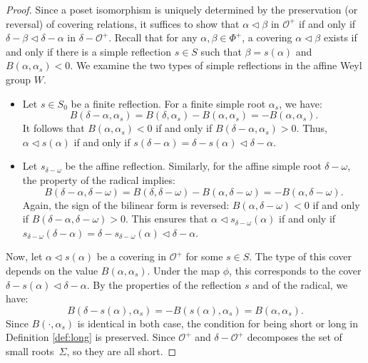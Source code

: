 \documentclass{amsart}
\theoremstyle{definition}
\newcommand{\mo}{\mathcal{O}}
\begin{document}
\begin{proof}
Since a poset isomorphism is uniquely determined by the preservation (or reversal) of covering relations, it suffices to show that $\alpha \lhd \beta$ in $\mo^+$ if and only if $\delta - \beta \lhd \delta - \alpha$ in $\delta - \mo^+$. Recall that for any $\alpha, \beta \in \Phi^+$, a covering $\alpha \lhd \beta$ exists if and only if there is a simple reflection $s \in S$ such that $\beta = s(\alpha)$ and $B(\alpha, \alpha_s) < 0$. We examine the two types of simple reflections in the affine Weyl group $W$.

\begin{itemize}
    \item[(i)] Let $s \in S_0$ be a finite reflection. For a finite simple root $\alpha_s$, we have:
    \[ B(\delta - \alpha, \alpha_s) = B(\delta, \alpha_s) - B(\alpha, \alpha_s) = -B(\alpha, \alpha_s). \]
    It follows that $B(\alpha, \alpha_s) < 0$ if and only if $B(\delta - \alpha, \alpha_s) > 0$. Thus, $\alpha \lhd s(\alpha)$ if and only if  $s(\delta - \alpha) = \delta - s(\alpha) \lhd \delta - \alpha$.

    \item[(ii)] Let $s_{\delta-\omega}$ be the affine reflection. Similarly, for the affine simple root $\delta - \omega$, the property of the radical implies:
    \[ B(\delta - \alpha, \delta - \omega) = B(\delta, \delta - \omega) - B(\alpha, \delta - \omega) = -B(\alpha, \delta - \omega). \]
    Again, the sign of the bilinear form is reversed: $B(\alpha, \delta - \omega) < 0$ if and only if $B(\delta - \alpha, \delta - \omega) > 0$. This ensures that $\alpha \lhd s_{\delta-\omega}(\alpha)$ if and only if $s_{\delta-\omega}(\delta - \alpha) = \delta - s_{\delta-\omega}(\alpha) \lhd \delta - \alpha$.
\end{itemize}

Now, let $\alpha \lhd s(\alpha)$ be a covering in $\mo^+$ for some $s \in S$. The type of this cover depends on the value $B(\alpha, \alpha_s)$. Under the map $\phi$, this corresponds to the cover $\delta-s(\alpha) \lhd \delta -\alpha$. By the properties of the reflection $s$ and of the radical, we have:
\[
B(\delta - s(\alpha), \alpha_s) = -B(s(\alpha), \alpha_s) = B(\alpha, \alpha_s).
\]
Since  $B(\cdot, \alpha_s)$ is identical in both case, the condition for being short or long in Definition \ref{def:long} is preserved. Since $\mo^+$ and $\delta-\mo^+$ decomposes the set of small roots~$\Sigma$, so they are all short. 
\end{proof}
\end{document}
